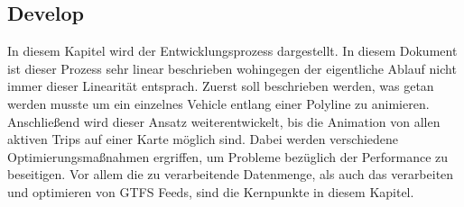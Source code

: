\begin{newpage}
  \section{Develop}
  \label{sec:develop}

    In diesem Kapitel wird der Entwicklungsprozess dargestellt. In diesem Dokument ist dieser Prozess sehr linear beschrieben wohingegen der eigentliche Ablauf nicht immer dieser Linearität entsprach. Zuerst soll beschrieben werden, was getan werden musste um ein einzelnes Vehicle entlang einer Polyline zu animieren. Anschließend wird dieser Ansatz weiterentwickelt, bis die Animation von allen aktiven Trips auf einer Karte möglich sind. Dabei werden verschiedene Optimierungsmaßnahmen ergriffen, um Probleme bezüglich der Performance zu beseitigen. Vor allem die zu verarbeitende Datenmenge, als auch das verarbeiten und optimieren von GTFS Feeds, sind die Kernpunkte in diesem Kapitel. 

    
    
    
    
    
    

\end{newpage}